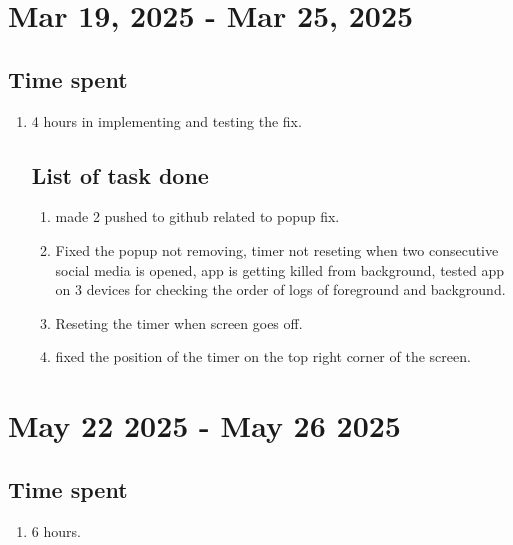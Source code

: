 \documentclass[12pt]{article}
\begin{document}
      \section{Mar 19, 2025 -  Mar 25, 2025}
      \subsection{Time spent}
      \begin{enumerate}
          \item 4 hours in implementing and testing the fix.
    \subsection{List of task done}
        \begin{enumerate}
            \item made 2 pushed to github related to popup fix.
            \item Fixed the popup not removing, timer not reseting when two consecutive social media is opened, app is getting killed from background, tested app on 3 devices for checking the order of logs of foreground and background.
            \item Reseting the timer when screen goes off.
            \item fixed the position of the timer on the top right corner of the screen.
        \end{enumerate}
      \end{enumerate}
    \section{May 22 2025 - May 26 2025}
    \subsection{Time spent}
    \begin{enumerate}
        \item 6 hours.
    \end{enumerate}
\end{document}
